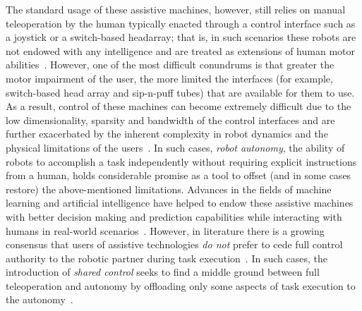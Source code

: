 \documentclass[12pt]{article}
\begin{document}
%
%
The standard usage of these assistive machines, however, still relies on manual teleoperation by the human typically enacted through a control interface such as a joystick or a switch-based headarray; that is, in such scenarios these robots are not endowed with any intelligence and are treated as extensions of human motor abilities~\cite{simpson2008tooth}. However, one of the most difficult conundrums is that greater the motor impairment of the user, the more limited the interfaces (for example, switch-based head array and sip-n-puff tubes) that are available for them to use. As a result, control of these machines can become extremely difficult due to the low dimensionality, sparsity and bandwidth of the control interfaces and are further exacerbated by the inherent complexity in robot dynamics and the physical limitations of the users~\cite{pilarski2012dynamic}.
In such cases, \textit{robot autonomy}, the ability of robots to accomplish a task independently without requiring explicit instructions from a human, holds considerable promise as a tool to offset (and in some cases restore) the above-mentioned limitations. Advances in the fields of machine learning and artificial intelligence have helped to endow these assistive machines with better decision making and prediction capabilities while interacting with humans in real-world scenarios~\cite{huang2015using}.
However, in literature there is a growing consensus that users of assistive technologies \textit{do not} prefer to cede full control authority to the robotic partner during task execution~\cite{gopinath2017human}. In such cases, the introduction of \textit{shared control} seeks to find a middle ground between full teleoperation and autonomy by offloading only some aspects of task execution to the autonomy~\cite{wasson2003user, demeester2008user}. 
\end{document}
